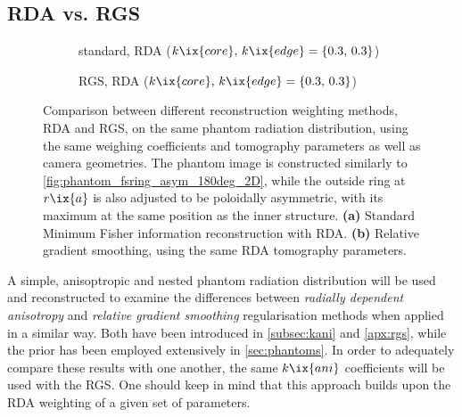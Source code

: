         \subsection{RDA vs. RGS}\label{apx:rdavsrgs}%
%
            \begin{figure}[t]%
                \centering%
                \begin{subfigure}{\textwidth}%
                    \centering%
                    \caption{standard, RDA ($k\ix{core},\,k\ix{edge}=\left\{0.3,\,0.3\right\}$)}%
                \end{subfigure}%
                \newline%
                \begin{subfigure}{\textwidth}%
                    \centering%
                    \caption{RGS, RDA ($k\ix{core},\,k\ix{edge}=\left\{0.3,\,0.3\right\}$)}%
                \end{subfigure}%
                \caption{Comparison between different reconstruction weighting methods, RDA and RGS, on the same phantom radiation distribution, using the same weighing coefficients and tomography parameters as well as camera geometries. The phantom image is constructed similarly to \cref{fig:phantom_fsring_asym_180deg_2D}, while the outside ring at $r\ix{a}$ is also adjusted to be poloidally asymmetric, with its maximum at the same position as the inner structure. \textbf{(a)} Standard Minimum Fisher information reconstruction with RDA. \textbf{(b)} Relative gradient smoothing, using the same RDA tomography parameters.}\label{fig:phantom_fsring_asym_comparison_RGS}%
            \end{figure}%
%
            A simple, anisoptropic and nested phantom radiation distribution will be used and reconstructed to examine the differences between \textit{radially dependent anisotropy} and \textit{relative gradient smoothing} regularisation methods when applied in a similar way. Both have been introduced in \cref{subsec:kani} and \cref{apx:rgs}, while the prior has been employed extensively in \cref{sec:phantoms}. In order to adequately compare these results with one another, the same $k\ix{ani}$ coefficients will be used with the RGS. One should keep in mind that this approach builds upon the RDA weighting of a given set of parameters.\\%
